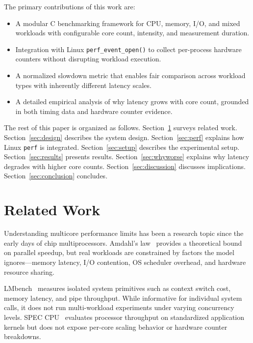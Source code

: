 \documentclass[conference]{IEEEtran}
\begin{document}
The primary contributions of this work are:
\begin{itemize}
  \item A modular C benchmarking framework for CPU, memory, I/O, and mixed
        workloads with configurable core count, intensity, and measurement
        duration.
  \item Integration with Linux \texttt{perf\_event\_open()} to collect
        per-process hardware counters without disrupting workload execution.
  \item A normalized slowdown metric that enables fair comparison across
        workload types with inherently different latency scales.
  \item A detailed empirical analysis of why latency grows with core
        count, grounded in both timing data and hardware counter evidence.
\end{itemize}

The rest of this paper is organized as follows.
Section~\ref{sec:related} surveys related work.
Section~\ref{sec:design} describes the system design.
Section~\ref{sec:perf} explains how Linux \texttt{perf} is integrated.
Section~\ref{sec:setup} describes the experimental setup.
Section~\ref{sec:results} presents results.
Section~\ref{sec:whyworse} explains why latency degrades with higher core counts.
Section~\ref{sec:discussion} discusses implications.
Section~\ref{sec:conclusion} concludes.

\section{Related Work}
\label{sec:related}

Understanding multicore performance limits has been a research topic since
the early days of chip multiprocessors.  Amdahl's law~\cite{gregg2020}
provides a theoretical bound on parallel speedup, but real workloads are
constrained by factors the model ignores---memory latency, I/O contention,
OS scheduler overhead, and hardware resource sharing.

LMbench~\cite{lmbench} measures isolated system primitives such as context
switch cost, memory latency, and pipe throughput.  While informative for
individual system calls, it does not run multi-workload experiments under
varying concurrency levels.  SPEC CPU~\cite{spec} evaluates processor
throughput on standardized application kernels but does not expose per-core
scaling behavior or hardware counter breakdowns.
\end{document}
